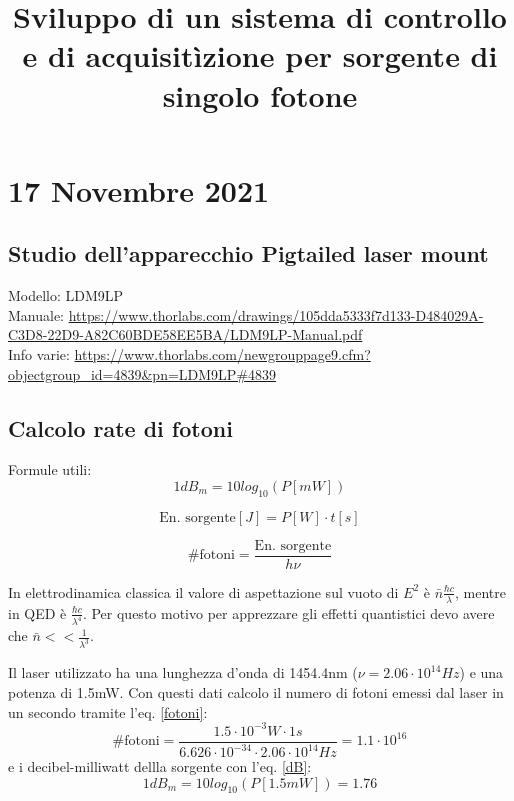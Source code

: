 \documentclass{article}
\title{Sviluppo di un sistema di controllo e di acquisitìzione per sorgente di singolo fotone}
\begin{document}
\maketitle

\section{17 Novembre 2021}
\subsection{Studio dell’apparecchio Pigtailed laser mount}
Modello: LDM9LP\\
Manuale: \url{https://www.thorlabs.com/drawings/105dda5333f7d133-D484029A-C3D8-22D9-A82C60BDE58EE5BA/LDM9LP-Manual.pdf}\\
Info varie: \url{ https://www.thorlabs.com/newgrouppage9.cfm?objectgroup_id=4839&pn=LDM9LP#4839}\\

\subsection{Calcolo rate di fotoni}
Formule utili:
\begin{equation} \label{dB}
    1 dB_m=10 log_{10}\left(P\left[mW\right]\right)
\end{equation}

\begin{equation} \label{energia}
    \textrm{En. sorgente} [J] = P[W]\cdot t[s]
\end{equation}

\begin{equation} \label{fotoni}
    \# \textrm{fotoni}=\frac{\textrm{En. sorgente}}{h\nu}
\end{equation}

In elettrodinamica classica il valore di aspettazione sul vuoto di $E^2$ è $\bar{n} \frac{\hbar c}{\lambda}$, mentre in QED è $\frac{\hbar c}{\lambda^4}$.
Per questo motivo per apprezzare gli effetti quantistici devo avere che $\bar{n}<<\frac{1}{\lambda^3}$.

Il laser utilizzato ha una lunghezza d'onda di 1454.4nm ($\nu = 2.06 \cdot 10^{14}Hz$) e una potenza di 1.5mW. Con questi dati calcolo il numero di fotoni emessi dal laser in un secondo tramite l'eq. \ref{fotoni}:
\begin{equation*} 
    \# \textrm{fotoni}=\frac{1.5\cdot10^{-3}W\cdot1s}{6.626 \cdot 10^{-34}\cdot 2.06 \cdot 10^{14}Hz} = 1.1\cdot 10^{16}
\end{equation*}
e i decibel-milliwatt dellla sorgente con l'eq. \ref{dB}:
\begin{equation*}
    1dB_m=10log_{10}\left(P\left[1.5mW\right]\right)=1.76
\end{equation*}
\end{document}
